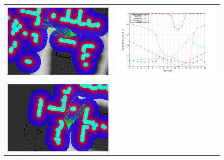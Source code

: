 \begin{figure}[h!]
\begin{tabular}{cc}
\begin{minipage}{.45\textwidth}
      \includegraphics[width=\textwidth]{example14}
    \end{minipage} &
    \begin{minipage}{.45\textwidth}
      \centering
      \includegraphics[width=\textwidth,trim=50 40 80 60,clip]{costs14}\label{fig:cp07_example6}
    \end{minipage}\\ \\
    \begin{minipage}{.45\textwidth}
      \centering
      \includegraphics[width=\textwidth]{example17}

\end{minipage}
\end{tabular}
\end{figure}
